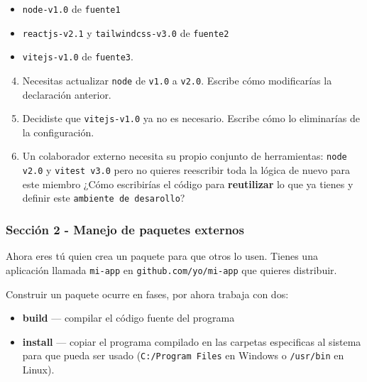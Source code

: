 \begin{itemize}
\item \texttt{node-v1.0} de \texttt{fuente1}
\item \texttt{reactjs-v2.1} y \texttt{tailwindcss-\allowbreak{}v3.\allowbreak{}0} de \texttt{fuente2}
\item \texttt{vitejs-v1.0} de \texttt{fuente3}.
\end{itemize}

\begin{enumerate}
\setcounter{enumi}{3}
\item Necesitas actualizar \texttt{node} de \texttt{v1.0} a \texttt{v2.0}. Escribe cómo modificarías la declaración anterior.
\item Decidiste que \texttt{vitejs-v1.0} ya no es necesario. Escribe cómo lo eliminarías de la configuración.
\item Un colaborador externo necesita su propio conjunto de herramientas: \texttt{node v2.0} y \texttt{vitest v3.0} pero no quieres reescribir toda la lógica de nuevo para este miembro ¿Cómo escribirías el código para \textbf{reutilizar} lo que ya tienes y definir este  \texttt{ambiente de desarollo}?
\end{enumerate}

\subsubsection{Sección 2 - Manejo de paquetes externos}

Ahora eres tú quien crea un paquete para que otros lo usen. Tienes una aplicación llamada \texttt{mi-app} en \texttt{github.\allowbreak{}com/\allowbreak{}yo/\allowbreak{}mi-\allowbreak{}app} que quieres distribuir.

Construir un paquete ocurre en fases, por ahora trabaja con dos:

\begin{itemize}
\item \textbf{build} --- compilar el código fuente del programa
\item \textbf{install} --- copiar el programa compilado en las carpetas especificas al sistema para que pueda ser usado (\texttt{C:/\allowbreak{}Program Files} en Windows o \texttt{/usr/bin} en Linux).
\end{itemize}

